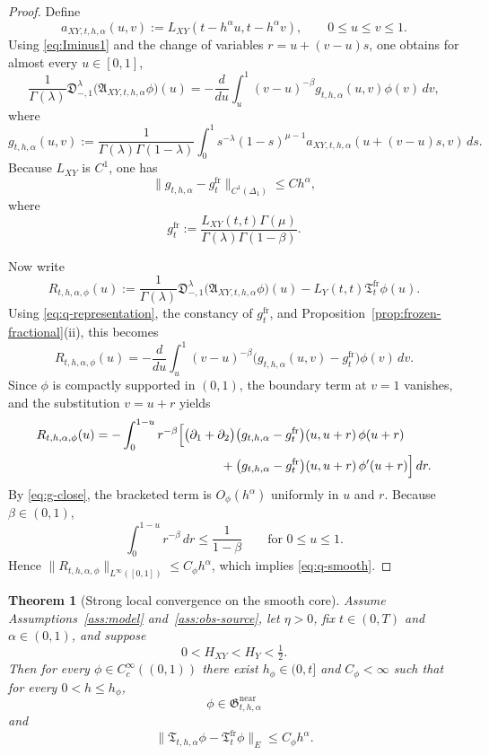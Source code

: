 \documentclass[11pt,a4paper]{amsart}
\theoremstyle{plain}
\newtheorem{theorem}{Theorem}[section]
\theoremstyle{definition}
\theoremstyle{remark}
\begin{document}
\begin{proof}
Define
\[
a_{XY,t,h,\alpha}(u,v):=
L_{XY}(t-h^\alpha u,t-h^\alpha v),
\qquad
0\le u\le v\le 1.
\]
Using \eqref{eq:Iminus1} and the change of variables \(r=u+(v-u)s\), one obtains for almost
every \(u\in[0,1]\),
\begin{equation}\label{eq:q-representation}
\frac{1}{\Gamma(\lambda)}
\mathfrak D_{-,1}^{\lambda}\bigl(\mathfrak A_{XY,t,h,\alpha}\phi\bigr)(u)
=
-\frac{d}{du}\int_u^1 (v-u)^{-\beta}g_{t,h,\alpha}(u,v)\phi(v)\,dv,
\end{equation}
where
\[
g_{t,h,\alpha}(u,v)
:=
\frac{1}{\Gamma(\lambda)\Gamma(1-\lambda)}
\int_0^1 s^{-\lambda}(1-s)^{\mu-1}
a_{XY,t,h,\alpha}(u+(v-u)s,v)\,ds.
\]
Because \(L_{XY}\) is \(C^1\), one has
\begin{equation}\label{eq:g-close}
\|g_{t,h,\alpha}-g_t^{\mathrm{fr}}\|_{C^1(\Delta_1)}
\le
Ch^\alpha,
\end{equation}
where
\[
g_t^{\mathrm{fr}}
:=
\frac{L_{XY}(t,t)\Gamma(\mu)}{\Gamma(\lambda)\Gamma(1-\beta)}.
\]

Now write
\[
R_{t,h,\alpha,\phi}(u)
:=
\frac{1}{\Gamma(\lambda)}
\mathfrak D_{-,1}^{\lambda}\bigl(\mathfrak A_{XY,t,h,\alpha}\phi\bigr)(u)
-L_Y(t,t)\mathfrak T_t^{\mathrm{fr}}\phi(u).
\]
Using \eqref{eq:q-representation}, the constancy of \(g_t^{\mathrm{fr}}\), and
Proposition~\ref{prop:frozen-fractional}(ii), this becomes
\[
R_{t,h,\alpha,\phi}(u)
=
-\frac{d}{du}\int_u^1 (v-u)^{-\beta}
\bigl(g_{t,h,\alpha}(u,v)-g_t^{\mathrm{fr}}\bigr)\phi(v)\,dv.
\]
Since \(\phi\) is compactly supported in \((0,1)\), the boundary term at \(v=1\) vanishes, and
the substitution \(v=u+r\) yields
\begin{align*}
R_{t,h,\alpha,\phi}(u)
&=
-\int_0^{1-u} r^{-\beta}
\Bigl[
\bigl(\partial_1+\partial_2\bigr)
\bigl(g_{t,h,\alpha}-g_t^{\mathrm{fr}}\bigr)(u,u+r)\,\phi(u+r) \\
&\qquad\qquad\qquad\qquad\qquad
+\bigl(g_{t,h,\alpha}-g_t^{\mathrm{fr}}\bigr)(u,u+r)\,\phi'(u+r)
\Bigr]\,dr.
\end{align*}
By \eqref{eq:g-close}, the bracketed term is \(O_\phi(h^\alpha)\) uniformly in \(u\) and \(r\).
Because \(\beta\in(0,1)\),
\[
\int_0^{1-u} r^{-\beta}\,dr\le \frac{1}{1-\beta}
\qquad\text{for }0\le u\le 1.
\]
Hence \(\|R_{t,h,\alpha,\phi}\|_{L^\infty([0,1])}\le C_\phi h^\alpha\), which implies
\eqref{eq:q-smooth}.
\end{proof}

\begin{theorem}[Strong local convergence on the smooth core]
\label{thm:smooth-core}
Assume Assumptions~\ref{ass:model} and~\ref{ass:obs-source}, let \(\eta>0\), fix \(t\in(0,T)\)
and \(\alpha\in(0,1)\), and suppose
\[
0<H_{XY}<H_Y<\tfrac12.
\]
Then for every \(\phi\in C_c^\infty((0,1))\) there exist \(h_\phi\in(0,t]\) and
\(C_\phi<\infty\) such that for every \(0<h\le h_\phi\),
\[
\phi\in \mathfrak G_{t,h,\alpha}^{\mathrm{near}}
\]
and
\begin{equation}\label{eq:smooth-core-strong}
\|\mathfrak T_{t,h,\alpha}\phi-\mathfrak T_t^{\mathrm{fr}}\phi\|_E
\le
C_\phi h^\alpha.
\end{equation}
\end{theorem}
\end{document}
